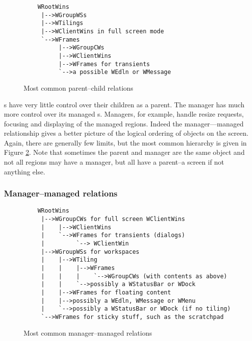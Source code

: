 \begin{figure}
\begin{htmlonly}
\docode %
\end{htmlonly}
\begin{verbatim}
    WRootWins
     |-->WGroupWSs
     |-->WTilings
     |-->WClientWins in full screen mode
     `-->WFrames
          |-->WGroupCWs
          |-->WClientWins
          |-->WFrames for transients
          `-->a possible WEdln or WMessage
\end{verbatim}
\caption{Most common parent--child relations}
\label{fig:parentship}
\end{figure}

s have very little control over their children as a parent.
The manager  has much more control over its
managed s. Managers, for example, handle resize requests,
focusing and displaying of the managed regions. Indeed the manager---managed
relationship gives a better picture of the logical ordering of objects on
the screen. Again, there are generally few limits, but the most common
hierarchy is given in Figure \ref{fig:managership}. Note that sometimes
the parent and manager are the same object and not all regions may have
a manager, but all have a parent--a screen if not anything else.

\subsubsection{Manager--managed relations}

\begin{figure}
\begin{htmlonly}
\docode %
\end{htmlonly}
\begin{verbatim}
    WRootWins
     |-->WGroupCWs for full screen WClientWins
     |    |-->WClientWins
     |    `-->WFrames for transients (dialogs)
     |         `--> WClientWin
     |-->WGroupWSs for workspaces
     |    |-->WTiling
     |    |    |-->WFrames
     |    |    |    `-->WGroupCWs (with contents as above)
     |    |    `-->possibly a WStatusBar or WDock
     |    |-->WFrames for floating content
     |    |-->possibly a WEdln, WMessage or WMenu
     |    `-->possibly a WStatusBar or WDock (if no tiling)
     `-->WFrames for sticky stuff, such as the scratchpad
\end{verbatim}
\caption{Most common manager--managed relations}
\label{fig:managership}
\end{figure}


